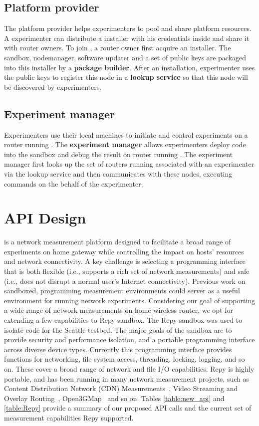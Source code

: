 \subsection{Platform provider}
The platform provider helps experimenters to pool and share platform resources. A experimenter can distribute a \sysname installer with his credentials inside and share it with router owners. To join \sysname, a router owner first acquire an \sysname installer. The sandbox, nodemanager, software updater and a set of public keys are packaged into this installer by a \textbf{package builder}. After an installation, experimenter uses the public keys to register this node in a \textbf{lookup service} so that this node will be discovered by experimenters.

\subsection{Experiment manager}
Experimenters use their local machines to initiate and control experiments on a router running \sysname. The \textbf{experiment manager} allows experimenters deploy code into the sandbox and debug the result on router running \sysname. The experiment manager first looks up the set of routers running \sysname associated with an experimenter via the lookup service and then communicates with these nodes, executing commands on the behalf of the experimenter.  

\section{API Design}
\sysname is a network measurement platform designed to facilitate a broad range of experiments on home gateway while controlling the impact on hosts' resources and network connectivity. A key challenge is selecting a programming interface that is both flexible (i.e., supports a rich set of network measurements) and safe (i.e., does not disrupt a normal user's Internet connectivity). Previous work on sandboxed, programming measurement environments \sysname could server as a useful environment for running network experiments. Considering our goal of supporting a wide range of network measurements on home wireless router, we opt for extending a few capabilities to Repy sandbox\cite{cappos2010retaining}. The Repy sandbox was used to isolate code for the Seattle testbed. The major goals of the sandbox are to provide security and performance isolation, and a portable programming interface across diverse device types. Currently this programming interface provides functions for networking, file system access, threading, locking, logging, and so on. These cover a broad range of network and file I/O capabilities. Repy is highly portable, and has been running in many network measurement projects, such as Content Distribution Network (CDN) Measurements~\cite{rafetseder2011exploring}, Video Streaming and Overlay Routing~\cite{eisl2011service}, Open3GMap~\cite{open3gmap} and so on. Tables \ref{table:new_api} and \ref{table:Repy} provide a summary of our proposed API calls and the current set of measurement capabilities Repy supported. 


